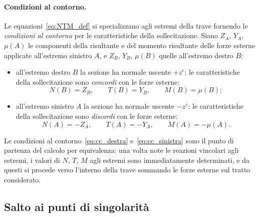 \paragraph{Condizioni al contorno.}
Le equazioni~\eqref{eq:NTM_def} si specializzano
agli estremi della trave fornendo le
\emph{condizioni al contorno} per le caratteristiche
della sollecitazione. Siano $Z_A$, $Y_A$, $\mu(A)$
le componenti della risultante e del momento
risultante delle forze esterne applicate
all'estremo sinistro $A$, e $Z_B$, $Y_B$, $\mu(B)$
quelle all'estremo destro $B$:
\begin{itemize}[nosep]
	\item all'estremo destro $B$ la sezione ha
	normale uscente $+z^e$: le caratteristiche
	della sollecitazione sono \emph{concordi} con
	le forze esterne:
	\begin{equation}\label{eq:cc_destra}
		N(B) = Z_B, \qquad
		T(B) = Y_B, \qquad
		M(B) = \mu(B);
	\end{equation}
	\item all'estremo sinistro $A$ la sezione ha
	normale uscente $-z^e$: le caratteristiche
	della sollecitazione sono \emph{discordi} con
	le forze esterne:
	\begin{equation}\label{eq:cc_sinistra}
		N(A) = -Z_A, \qquad
		T(A) = -Y_A, \qquad
		M(A) = -\mu(A).
	\end{equation}
\end{itemize}

\begin{oss}
	Le condizioni al contorno~\eqref{eq:cc_destra}
	e~\eqref{eq:cc_sinistra} sono il punto di
	partenza del calcolo per equivalenza: una volta
	note le reazioni vincolari agli estremi, i valori
	di $N$, $T$, $M$ agli estremi sono immediatamente
	determinati, e da questi si procede verso
	l'interno della trave sommando le forze esterne
	sul tratto considerato.
\end{oss}






\subsection{Salto ai punti di singolarità}
\label{sec:salto_singolarita}

